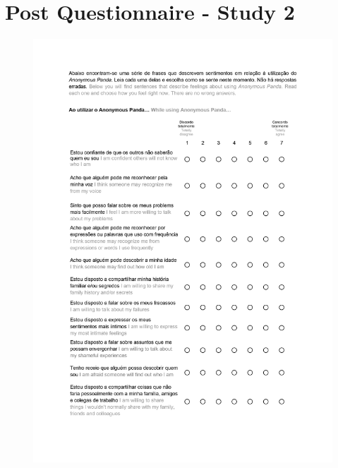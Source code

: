 \section{Post Questionnaire - Study 2}
\label{appendix:post2}
\begin{figure}[h!]
\centering
\includegraphics[width=\textwidth]{figures/02_03.jpg}
\end{figure}
